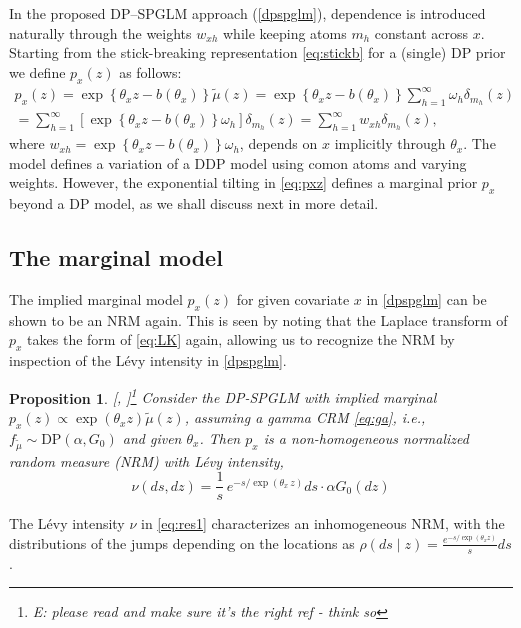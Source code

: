 \documentclass{article}[12pt]
\newcounter{theorem}
\newtheorem{proposition}{Proposition}
\newcommand{\schwarz}{\color{black}}
\newcommand{\ech}{\schwarz\rm}
\newcommand{\mynote}[1]{\footnote{#1}}
\newcommand{\citeaa}[1]{\citeauthor{#1}, \href{cite.#1}{\textcolor{blue}{\citeyear{#1}}}}     %
\newcommand{\refa}[1]{\textcolor{blue}{\ref{#1}}} %
\newcommand{\DP}{\mbox{DP}}
\renewcommand{\th}{\theta}
\newcommand{\tmu}{\widetilde{\mu}}
\begin{document}
In the proposed DP--SPGLM approach (\refa{dpspglm}), dependence is
introduced naturally through the weights $w_{xh}$ while
keeping atoms $m_h$ constant across $x$.
Starting from the stick-breaking representation
\eqref{eq:stickb}  for a (single) DP prior we define
$p_x(z)$ as follows:  
\begin{multline}
p_x(z)  = \exp\left\{\th_x z - b(\th_x)\right\} \tmu(z) 
=
\exp\left\{\th_x z - b(\th_x)\right\} \sum_{h=1}^\infty \omega_h
      \delta_{m_h} (z)  \nonumber \\
 = 
\sum_{h=1}^\infty \left[\exp\left\{\th_x z - b(\th_x)\right\}
      \omega_h\right] \delta_{m_h} (z) 
 =  
      \sum_{h=1}^\infty  w_{xh} \delta_{m_h} (z),
      \label{eq:pxz}
\end{multline}
where $w_{xh} = \exp\left\{\th_x z - b(\th_x)\right\}  \omega_h$,
depends on $x$ implicitly through $\th_x$. The model defines a variation of a DDP model using comon atoms and varying weights. However, the exponential tilting in \eqref{eq:pxz} defines a marginal prior $p_x$ beyond a DP model, as we shall
discuss next in more detail. 


\subsection{The marginal model}
\label{subsec:NRM}
The implied marginal model $p_x(z)$ for given covariate $x$ in
\eqref{dpspglm} can be shown to be an NRM again.
This is seen by noting that the Laplace transform of $p_x$ takes the
form of \eqref{eq:LK} again, allowing us to recognize the NRM by
inspection of the L\'evy intensity in \eqref{dpspglm}. 
\begin{proposition}
     \label{result1}
  [\citeaa{nieto2004normalized}]\mynote{E: please read and make sure it's
    the right ref - think so}
  Consider the DP-SPGLM with implied marginal $p_x(z) \propto \exp(\th_{x}
  z) \widetilde \mu(z)$, assuming a gamma CRM \eqref{eq:ga}, i.e.,
  $f_{\tmu} \sim \DP(\alpha, G_0)$ and given $\th_x$.
  Then $p_x$ \ech is a
  non-homogeneous normalized random measure (NRM) with L\'evy intensity,
  \begin{equation}
  \nu(ds, dz) = \frac1s\,{e^{- s / \exp (\th_x\, z)}} ds \cdot \alpha
  G_0(dz)
  \label{eq:res1}
  \end{equation}
\end{proposition}
The L\'evy intensity $\nu$ in \eqref{eq:res1} characterizes an
inhomogeneous NRM, with the distributions of the jumps depending
on the locations as $\rho(ds \mid z) = \frac{e^{- s / \exp (\th_x z)}}{s}
ds$. 
\end{document}
